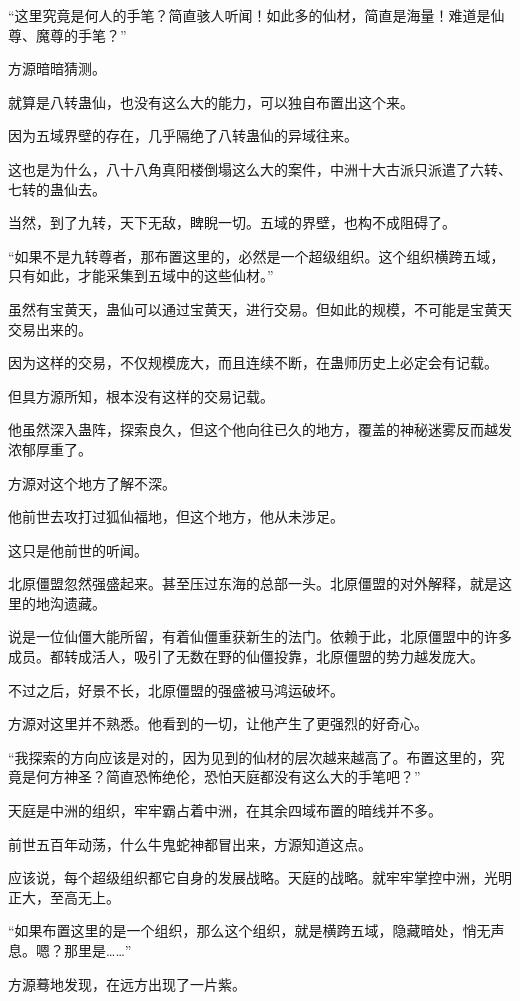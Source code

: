 \begin{this_body}
“这里究竟是何人的手笔？简直骇人听闻！如此多的仙材，简直是海量！难道是仙尊、魔尊的手笔？”

方源暗暗猜测。

就算是八转蛊仙，也没有这么大的能力，可以独自布置出这个来。

因为五域界壁的存在，几乎隔绝了八转蛊仙的异域往来。

这也是为什么，八十八角真阳楼倒塌这么大的案件，中洲十大古派只派遣了六转、七转的蛊仙去。

当然，到了九转，天下无敌，睥睨一切。五域的界壁，也构不成阻碍了。

“如果不是九转尊者，那布置这里的，必然是一个超级组织。这个组织横跨五域，只有如此，才能采集到五域中的这些仙材。”

虽然有宝黄天，蛊仙可以通过宝黄天，进行交易。但如此的规模，不可能是宝黄天交易出来的。

因为这样的交易，不仅规模庞大，而且连续不断，在蛊师历史上必定会有记载。

但具方源所知，根本没有这样的交易记载。

他虽然深入蛊阵，探索良久，但这个他向往已久的地方，覆盖的神秘迷雾反而越发浓郁厚重了。

方源对这个地方了解不深。

他前世去攻打过狐仙福地，但这个地方，他从未涉足。

这只是他前世的听闻。

北原僵盟忽然强盛起来。甚至压过东海的总部一头。北原僵盟的对外解释，就是这里的地沟遗藏。

说是一位仙僵大能所留，有着仙僵重获新生的法门。依赖于此，北原僵盟中的许多成员。都转成活人，吸引了无数在野的仙僵投靠，北原僵盟的势力越发庞大。

不过之后，好景不长，北原僵盟的强盛被马鸿运破坏。

方源对这里并不熟悉。他看到的一切，让他产生了更强烈的好奇心。

“我探索的方向应该是对的，因为见到的仙材的层次越来越高了。布置这里的，究竟是何方神圣？简直恐怖绝伦，恐怕天庭都没有这么大的手笔吧？”

天庭是中洲的组织，牢牢霸占着中洲，在其余四域布置的暗线并不多。

前世五百年动荡，什么牛鬼蛇神都冒出来，方源知道这点。

应该说，每个超级组织都它自身的发展战略。天庭的战略。就牢牢掌控中洲，光明正大，至高无上。

“如果布置这里的是一个组织，那么这个组织，就是横跨五域，隐藏暗处，悄无声息。嗯？那里是……”

方源蓦地发现，在远方出现了一片紫。


\end{this_body}
